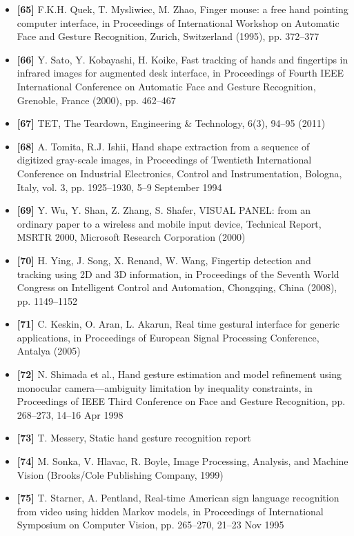 \documentclass[12pt, a4paper]{article}
\begin{document}
\begin{itemize}[label=]
    \item \textbf{[65]} F.K.H. Quek, T. Mysliwiec, M. Zhao, Finger mouse: a free hand pointing computer interface, in Proceedings of International Workshop on Automatic Face and Gesture Recognition, Zurich, Switzerland (1995), pp. 372–377
    \item \textbf{[66]} Y. Sato, Y. Kobayashi, H. Koike, Fast tracking of hands and fingertips in infrared images for augmented desk interface, in Proceedings of Fourth IEEE International Conference on Automatic Face and Gesture Recognition, Grenoble, France (2000), pp. 462–467
    \item \textbf{[67]} TET, The Teardown, Engineering \& Technology, 6(3), 94–95 (2011)
    \item \textbf{[68]} A. Tomita, R.J. Ishii, Hand shape extraction from a sequence of digitized gray-scale images, in Proceedings of Twentieth International Conference on Industrial Electronics, Control and Instrumentation, Bologna, Italy, vol. 3, pp. 1925–1930, 5–9 September 1994
    \item \textbf{[69]} Y. Wu, Y. Shan, Z. Zhang, S. Shafer, VISUAL PANEL: from an ordinary paper to a wireless and mobile input device, Technical Report, MSRTR 2000, Microsoft Research Corporation (2000)
    \item \textbf{[70]} H. Ying, J. Song, X. Renand, W. Wang, Fingertip detection and tracking using 2D and 3D information, in Proceedings of the Seventh World Congress on Intelligent Control and Automation, Chongqing, China (2008), pp. 1149–1152
    \item \textbf{[71]} C. Keskin, O. Aran, L. Akarun, Real time gestural interface for generic applications, in Proceedings of European Signal Processing Conference, Antalya (2005)
    \item \textbf{[72]} N. Shimada et al., Hand gesture estimation and model refinement using monocular camera—ambiguity limitation by inequality constraints, in Proceedings of IEEE Third Conference on Face and Gesture Recognition, pp. 268–273, 14–16 Apr 1998
    \item \textbf{[73]} T. Messery, Static hand gesture recognition report
    \item \textbf{[74]} M. Sonka, V. Hlavac, R. Boyle, Image Processing, Analysis, and Machine Vision (Brooks/Cole Publishing Company, 1999)
    \item \textbf{[75]} T. Starner, A. Pentland, Real-time American sign language recognition from video using hidden Markov models, in Proceedings of International Symposium on Computer Vision, pp. 265–270, 21–23 Nov 1995

\end{itemize}
\end{document}
